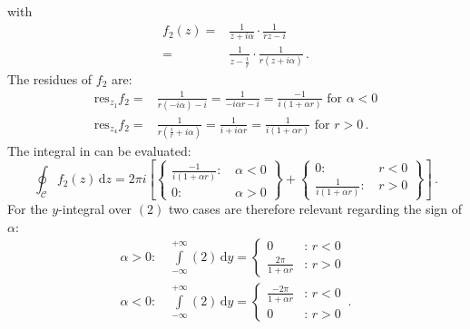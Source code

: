 with
\begin{align}
  f_2(z) =& \frac{1}{z + i \alpha}    \cdot \frac{1}{r z - i} \\
         =& \frac{1}{z - \frac{i}{r}} \cdot \frac{1}{r(z + i \alpha)} \, .
\end{align}
The residues of $f_2$ are:
\begin{align}
 \mathrm{res}_{z_1} f_2 =& \frac{1}{r(-i \alpha)  - i}
                        =  \frac{1}{  -i \alpha r - i}
                        =  \frac{-1}{i(1 + \alpha r)}
                        \textrm{ for } \alpha < 0 \\
 \mathrm{res}_{z_4} f_2 =& \frac{1}{r(\frac{i}{r} + i \alpha)}
                        =  \frac{1}{i + i \alpha r}
                        =  \frac{1}{i(1 + \alpha r)}
                        \textrm{ for } r > 0\, .
\end{align}
The integral in  can be evaluated:
\begin{equation}
   \oint_\mathcal{C} f_2(z) \,\mathrm{d}z
 = 2 \pi i \left[ \left\{ \begin{aligned}
                   \frac{-1}{i(1 + \alpha r)} :&\, \alpha<0 \\
                   0                          :&\, \alpha>0
                  \end{aligned} \right\}
                 +\left\{ \begin{aligned}
                   0                         :&\, r < 0 \\
                   \frac{1}{i(1 + \alpha r)} :&\, r > 0
                  \end{aligned} \right\}
 \right] \, .
\end{equation}
For the $y$-integral over $(2)$ two cases are therefore relevant regarding the sign of $\alpha$:
\begin{align}
 \alpha > 0 :&\, \int\limits_{-\infty}^{+\infty} (2) \,\mathrm{d}y = \begin{cases}
                                                                      0                        &:\, r<0 \\
                                                                      \frac{ 2\pi}{1+\alpha r} &:\, r>0
                                                                     \end{cases} \\
 \alpha < 0 :&\, \int\limits_{-\infty}^{+\infty} (2) \,\mathrm{d}y = \begin{cases}
                                                                      \frac{-2\pi}{1+\alpha r} &:\, r<0 \\
                                                                      0                        &:\, r>0
                                                                     \end{cases} \, .
\end{align}
